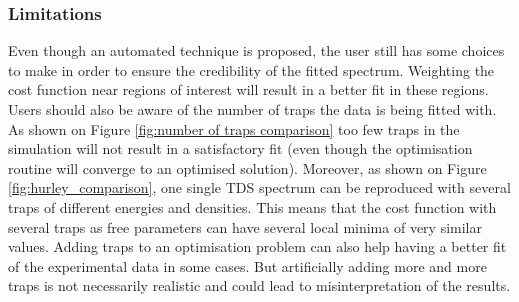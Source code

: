 

\subsubsection{Limitations}

Even though an automated technique is proposed, the user still has some choices to make in order to ensure the credibility of the fitted spectrum.
Weighting the cost function near regions of interest will result in a better fit in these regions.
Users should also be aware of the number of traps the data is being fitted with.
As shown on Figure \ref{fig:number of traps comparison} too few traps in the simulation will not result in a satisfactory fit (even though the optimisation routine will converge to an optimised solution).
Moreover, as shown on Figure \ref{fig:hurley_comparison}, one single TDS spectrum can be reproduced with several traps of different energies and densities.
This means that the cost function with several traps as free parameters can have several local minima of very similar values.
Adding traps to an optimisation problem can also help having a better fit of the experimental data in some cases.
But artificially adding more and more traps is not necessarily realistic and could lead to misinterpretation of the results.

